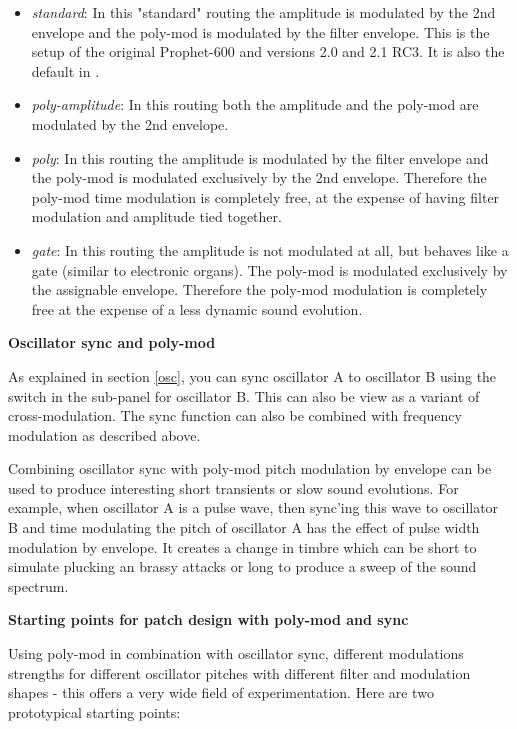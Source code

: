 \begin{itemize}
  \setlength\itemsep{0cm}
  \item \textit{standard}: In this "standard" routing the amplitude is modulated by the 2nd envelope and the poly-mod is modulated by the filter envelope. This is the setup of the original Prophet-600 and versions 2.0 and 2.1 RC3. It is also the default in \version.
  \item \textit{poly-amplitude}: In this routing both the amplitude and the poly-mod are modulated by the 2nd envelope. 
  \item \textit{poly}: In this routing the amplitude is modulated by the filter envelope and the poly-mod is modulated exclusively by the 2nd envelope. Therefore the poly-mod time modulation is completely free, at the expense of having filter modulation and amplitude tied together.
  \item \textit{gate}: In this routing the amplitude is not modulated at all, but behaves like a gate (similar to electronic organs). The poly-mod is modulated exclusively by the assignable envelope. Therefore the poly-mod modulation is completely free at the expense of a less dynamic sound evolution.
\end{itemize}  


\textbf{Oscillator sync and poly-mod}

As explained in section \ref{osc}, you can sync oscillator A to oscillator B using the \oscsync switch in the sub-panel for oscillator B. This can also be view as a variant of cross-modulation. The sync function can also be combined with frequency modulation as described above. 

Combining oscillator sync with poly-mod pitch modulation by envelope can be used to produce interesting short transients or slow sound evolutions. For example, when oscillator A is a pulse wave, then sync'ing this wave to oscillator B and time modulating the pitch of oscillator A has the effect of pulse width modulation by envelope. It creates a change in timbre which can be short to simulate plucking an brassy attacks or long to produce a sweep of the sound spectrum.

\textbf{Starting points for patch design with poly-mod and sync}

Using poly-mod in combination with oscillator sync, different modulations strengths for different oscillator pitches with different filter and modulation shapes - this offers a very wide field of experimentation. Here are two prototypical starting points:

